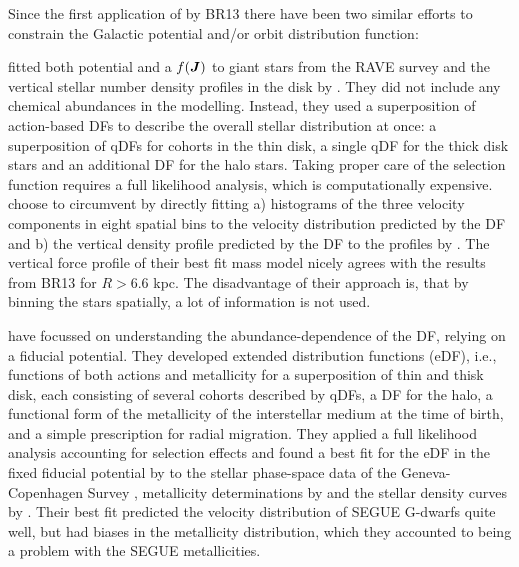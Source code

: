 Since the first application of \RM{} by BR13 there have been two similar efforts to constrain the Galactic potential and/or orbit distribution function:

\citet{2014MNRAS.445.3133P} fitted both potential and a $f(\boldsymbol{J})$ to giant stars from the RAVE survey \citep{2006AJ....132.1645S} and the vertical stellar number density profiles in the disk by \citet{2008ApJ...673..864J}. They did not include any chemical abundances in the modelling. Instead, they used a superposition of action-based DFs to describe the overall stellar distribution at once: a superposition of qDFs for cohorts in the thin disk, a single qDF for the thick disk stars and an additional DF for the halo stars. Taking proper care of the selection function requires a full likelihood analysis, which is computationally expensive. \citet{2014MNRAS.445.3133P} choose to circumvent by directly fitting a) histograms of the three velocity components in eight spatial bins to the velocity distribution predicted by the DF and b) the vertical density profile predicted by the DF to the profiles by \citet{2008ApJ...673..864J}. The vertical force profile of their best fit mass model nicely agrees with the results from BR13 for $R>6.6$ kpc. The disadvantage of their approach is, that by binning the stars spatially, a lot of information is not used.

\citet{2015MNRAS.449.3479S} have focussed on understanding the abundance-dependence of the DF, relying on a fiducial potential. They developed extended distribution functions (eDF), i.e., functions of both actions and metallicity for a superposition of thin and thisk disk, each consisting of several cohorts described by qDFs, a DF for the halo, a functional form of the metallicity of the interstellar medium at the time of birth, and a simple prescription for radial migration. They applied a full likelihood analysis accounting for selection effects and found a best fit for the eDF in the fixed fiducial potential by \citet{1998MNRAS.294..429D} to the stellar phase-space data of the Geneva-Copenhagen Survey \citep{2004A&A...418..989N,2009A&A...501..941H}, metallicity determinations by \citet{2011A&A...530A.138C} and the stellar density curves by \citet{1983MNRAS.202.1025G}. Their best fit predicted the velocity distribution of SEGUE G-dwarfs \citep{2014ApJS..211...17A} quite well, but had biases in the metallicity distribution, which they accounted to being a problem with the SEGUE metallicities. \\


